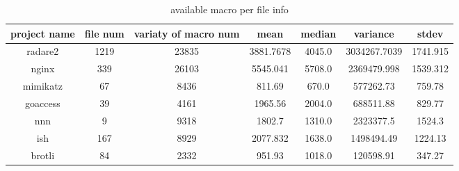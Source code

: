 \begin{table}[h]
	\caption{available macro per file info}
	\label{table:available_macro_info}	
		\begin{tabular}{ccccccc}
		\hline
		project name & file num & variaty of macro num & mean & median & variance & stdev \\ 
		\hline \hline
		radare2 & 1219 & 23835 & 3881.7678 & 4045.0 & 3034267.7039 & 1741.915 \\ 
		\hline
		nginx & 339 & 26103 & 5545.041 & 5708.0 & 2369479.998 & 1539.312 \\ 
		\hline
		mimikatz & 67 & 8436 & 811.69 & 670.0 & 577262.73 & 759.78 \\ 
		\hline
		goaccess & 39 & 4161 & 1965.56 & 2004.0 & 688511.88 & 829.77 \\ 
		\hline
		nnn & 9 & 9318 & 1802.7 & 1310.0 & 2323377.5 & 1524.3 \\ 
		\hline
		ish & 167 & 8929 & 2077.832 & 1638.0 & 1498494.49 & 1224.13 \\ 
		\hline
		brotli & 84 & 2332 & 951.93 & 1018.0 & 120598.91 & 347.27 \\ 
		\hline
	\end{tabular}
\end{table}